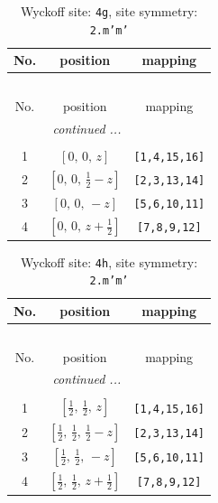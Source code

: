 \documentclass[fleqn,8pt]{jsarticle}
\begin{document}
\renewcommand{\arraystretch}{1.2}
\begin{longtable}{ccc}
\caption{Wyckoff site: {\tt 4g}, site symmetry: {\tt 2.m'm'}}
 \\
 \hline \hline
No. & position & mapping \\ \hline \endfirsthead

\multicolumn{2}{l}{\tablename\ \thetable{}} \\
 \hline \hline
No. & position & mapping \\ \hline \endhead

 \hline \hline
\multicolumn{2}{r}{\footnotesize\it continued ...} \\ \endfoot

 \hline \hline
\multicolumn{2}{r}{} \\ \endlastfoot

1 & $\left[ 0,\, 0,\, z \right]$ & {\tt [1,4,15,16]} \\ \hline
2 & $\left[ 0,\, 0,\, \frac{1}{2} - z \right]$ & {\tt [2,3,13,14]} \\ \hline
3 & $\left[ 0,\, 0,\, - z \right]$ & {\tt [5,6,10,11]} \\ \hline
4 & $\left[ 0,\, 0,\, z + \frac{1}{2} \right]$ & {\tt [7,8,9,12]} \\
\end{longtable}
\renewcommand{\arraystretch}{1.2}
\begin{longtable}{ccc}
\caption{Wyckoff site: {\tt 4h}, site symmetry: {\tt 2.m'm'}}
 \\
 \hline \hline
No. & position & mapping \\ \hline \endfirsthead

\multicolumn{2}{l}{\tablename\ \thetable{}} \\
 \hline \hline
No. & position & mapping \\ \hline \endhead

 \hline \hline
\multicolumn{2}{r}{\footnotesize\it continued ...} \\ \endfoot

 \hline \hline
\multicolumn{2}{r}{} \\ \endlastfoot

1 & $\left[ \frac{1}{2},\, \frac{1}{2},\, z \right]$ & {\tt [1,4,15,16]} \\ \hline
2 & $\left[ \frac{1}{2},\, \frac{1}{2},\, \frac{1}{2} - z \right]$ & {\tt [2,3,13,14]} \\ \hline
3 & $\left[ \frac{1}{2},\, \frac{1}{2},\, - z \right]$ & {\tt [5,6,10,11]} \\ \hline
4 & $\left[ \frac{1}{2},\, \frac{1}{2},\, z + \frac{1}{2} \right]$ & {\tt [7,8,9,12]} \\
\end{longtable}
\end{document}
